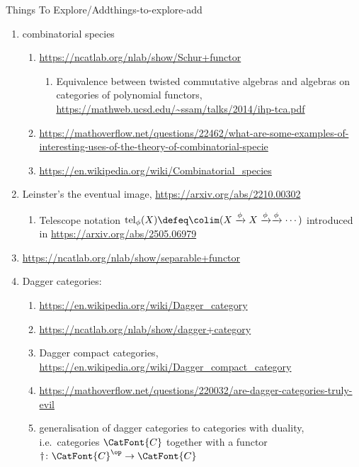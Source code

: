 \begin{remark}{Things To Explore/Add}{things-to-explore-add}
\begin{enumerate}
\begin{enumerate}
            \end{enumerate}
        \item combinatorial species
            \begin{enumerate}
                \item \url{https://ncatlab.org/nlab/show/Schur+functor}
                    \begin{enumerate}
                        \item Equivalence between twisted commutative algebras and algebras on categories of polynomial functors, \url{https://mathweb.ucsd.edu/~ssam/talks/2014/ihp-tca.pdf}
                    \end{enumerate}
                \item \url{https://mathoverflow.net/questions/22462/what-are-some-examples-of-interesting-uses-of-the-theory-of-combinatorial-specie}
                \item \url{https://en.wikipedia.org/wiki/Combinatorial_species}
            \end{enumerate}
        \item Leinster's the eventual image, \url{https://arxiv.org/abs/2210.00302}
            \begin{enumerate}
                \item Telescope notation $\mathrm{tel}_{\phi}(X)\defeq\colim(X\xrightarrow{\phi}X\xrightarrow{\phi}\xrightarrow{\phi}\cdots)$ introduced in \url{https://arxiv.org/abs/2505.06979}
            \end{enumerate}
        \item \url{https://ncatlab.org/nlab/show/separable+functor}
        \item Dagger categories:
            \begin{enumerate}
                \item \url{https://en.wikipedia.org/wiki/Dagger_category}
                \item \url{https://ncatlab.org/nlab/show/dagger+category}
                \item Dagger compact categories, \url{https://en.wikipedia.org/wiki/Dagger_compact_category}
                \item \url{https://mathoverflow.net/questions/220032/are-dagger-categories-truly-evil}
                \item generalisation of dagger categories to categories with duality, i.e.\ categories $\CatFont{C}$ together with a functor $\dagger\colon\CatFont{C}^{\op}\to\CatFont{C}$
                    \begin{enumerate}

\end{enumerate}
\end{enumerate}
\end{enumerate}
\end{remark}
